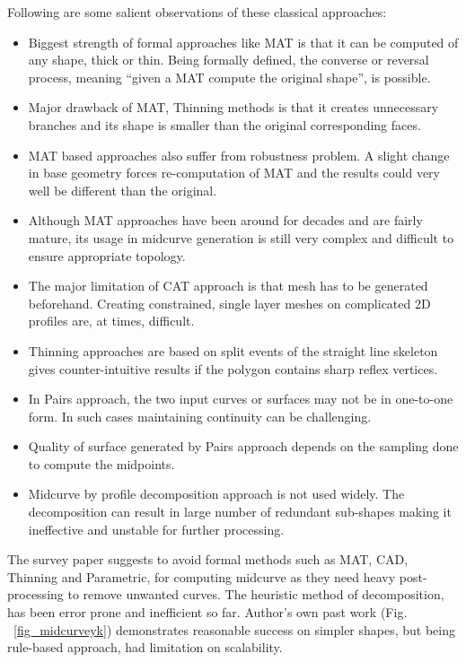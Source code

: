 \documentclass[9pt,academicons]{article}
\begin{document}
Following are some salient observations of these classical approaches:
\begin{itemize}[noitemsep,topsep=2pt,parsep=2pt,partopsep=2pt]
	\item Biggest strength of formal approaches like MAT is that it can be computed of any shape, thick or thin. Being formally defined, the converse or reversal process, meaning ``given a MAT compute the original shape'', is possible.
	\item Major drawback of MAT, Thinning methods is that it creates unnecessary branches and its shape is smaller than the original corresponding faces.
	\item  MAT based approaches also suffer from robustness problem. A slight change in base geometry forces re-computation of MAT and the results could very well be different than the original.
	\item Although MAT approaches have been around for decades and are fairly mature, its usage in midcurve generation is still very complex and difficult to ensure appropriate topology.
	\item The major limitation of CAT approach is that mesh has to be generated beforehand. Creating constrained, single layer meshes on complicated 2D profiles are, at times, difficult.
	\item Thinning approaches are based on split events of the straight line skeleton gives counter-intuitive results if the polygon contains sharp reflex vertices.
	\item In Pairs approach, the two input curves or surfaces may not be in one-to-one form. In such cases maintaining continuity can be challenging.
	\item Quality of surface generated by Pairs approach depends on the sampling done to compute the midpoints.
\item Midcurve by profile decomposition approach is not used widely. The decomposition can result in large number of redundant sub-shapes making it ineffective and unstable for further processing.
\end{itemize}

The survey paper \cite{medial2010} suggests to avoid formal methods such as MAT, CAD, Thinning and Parametric, for computing midcurve as they need heavy post-processing to remove unwanted curves. The heuristic method of decomposition,  has been error prone and inefficient so far. Author's own past work (Fig. ~\ref{fig_midcurveyk}) demonstrates reasonable success on simpler shapes, but being rule-based approach, had limitation on scalability.
\end{document}
